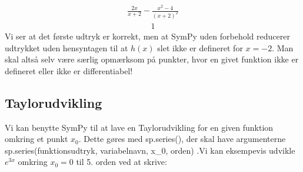 \documentclass[letterpaper,10pt,english]{jupyterBook}
\begin{document}
\begin{sphinxVerbatim}[commandchars=\\\{\}]
    
    
\end{sphinxVerbatim}
\begin{equation*}
\begin{split}\displaystyle \frac{2 x}{x + 2} - \frac{x^{2} - 4}{\left(x + 2\right)^{2}}\end{split}
\end{equation*}\begin{equation*}
\begin{split}\displaystyle 1\end{split}
\end{equation*}
Vi ser at det første udtryk er korrekt, men at SymPy uden forbehold reducerer udtrykket uden hensyntagen til at \(h(x)\) slet ikke er defineret for \(x=-2\). Man skal altså selv være særlig opmærksom på punkter, hvor en givet funktion ikke er defineret eller ikke er differentiabel!


\subsection{Taylorudvikling}
\label{\detokenize{notebooks/sympy/Notebook4:taylorudvikling}}
Vi kan benytte SymPy til at lave en Taylorudvikling for en given funktion omkring et punkt \(x_0\). Dette gøres med sp.series(), der skal have argumenterne sp.series(funktionsudtryk, variabelnavn, x\_0, orden)  .Vi kan eksempevis udvikle \(e^{3x}\) omkring \(x_0=0\) til 5. orden ved at skrive:
\end{document}
